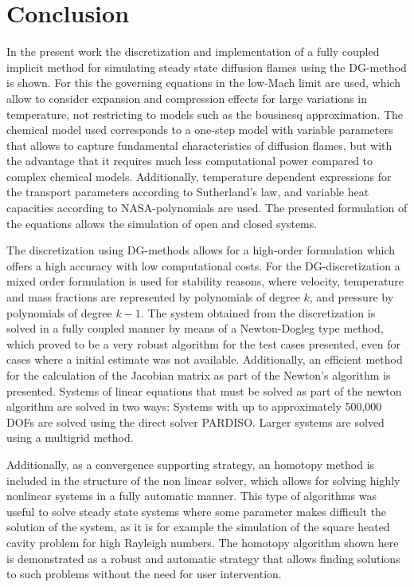 \chapter{Conclusion}	\label{ch:conclusion}

In the present work the discretization and implementation of a fully coupled implicit method for simulating steady state diffusion flames using the DG-method is shown. For this the governing equations in the low-Mach limit are used, which allow to consider expansion and compression effects for large variations in temperature, not restricting to models such as the bousinesq approximation. The chemical model used corresponds to a one-step model with variable parameters that allows to capture fundamental characteristics of diffusion flames, but with the advantage that it requires much less computational power compared to complex chemical models.  Additionally, temperature dependent expressions for the transport parameters according to Sutherland's law, and variable heat capacities according to NASA-polynomials are used. The presented formulation of the equations allows the simulation of open and closed systems. 

The discretization using DG-methods allows for a high-order formulation which offers a high accuracy with low computational costs. For the DG-discretization a mixed order formulation is used for stability reasons, where velocity, temperature and mass fractions are represented by polynomials of degree $k$, and pressure by polynomials of degree $k-1$. The system obtained from the discretization is solved in a fully coupled manner by means of a Newton-Dogleg type method, which proved to be a very robust algorithm for the test cases presented, even for cases where a initial estimate was not available. Additionally, an efficient method for the calculation of the Jacobian matrix as part of the Newton's algorithm is presented. Systems of linear equations that must be solved as part of the newton algorithm are solved in two ways: Systems with up to approximately 500,000 \gls{DOFs} are solved using the direct solver \gls{PARDISO}. Larger systems are solved using a multigrid method. 

Additionally, as a convergence supporting strategy, an homotopy method is included in the structure of the non linear solver, which allows for solving highly nonlinear systems in a fully automatic manner. This type of algorithms was useful to solve steady state systems where some parameter makes difficult the solution of the system, as it is for example the simulation of the square heated cavity problem for high Rayleigh numbers. The homotopy algorithm shown here is demonstrated as a robust and automatic strategy that allows finding solutions to such problems without the need for user intervention.

